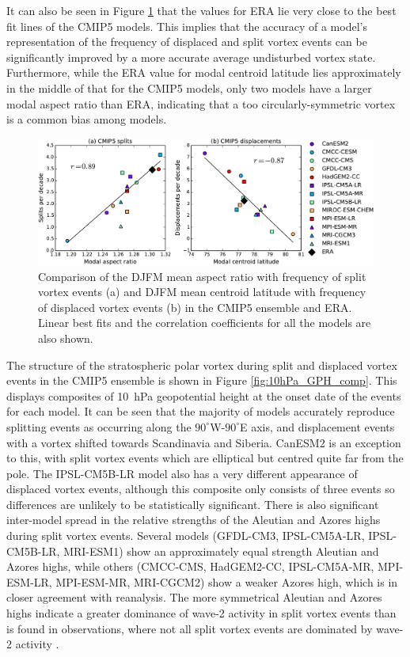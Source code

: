 It can also be seen in Figure \ref{fig:cmip5_moments_scatter} that the values
for ERA lie very close to the best fit lines of the CMIP5 models. This implies
that the accuracy of a model's representation of the frequency of displaced and
split vortex events can be significantly improved by a more accurate average
undisturbed vortex state. Furthermore, while the ERA value for modal centroid
latitude lies approximately in the middle of that for the CMIP5 models, only two
models have a larger modal aspect ratio than ERA, indicating that a too
circularly-symmetric vortex is a common bias among models.

\begin{figure}
 \centering
 \noindent\includegraphics[width=\textwidth]{figures/chapter-models/CMIP5_moments_scatter.pdf}
 \caption[Comparison of moment diagnostics and frequency of split and displaced
 vortex events.]{Comparison of the DJFM mean aspect ratio with frequency of
   split vortex events (a) and DJFM mean centroid latitude with frequency of
   displaced vortex events (b) in the CMIP5 ensemble and ERA. Linear best fits
   and the correlation coefficients for all the models are also shown.}
 \label{fig:cmip5_moments_scatter}
\end{figure}

The structure of the stratospheric polar vortex during split and displaced
vortex events in the CMIP5 ensemble is shown in Figure
\ref{fig:10hPa_GPH_comp}. This displays composites of 10~hPa geopotential
height at the onset date of the events for each model. It can be seen that the
majority of models accurately reproduce splitting events as occurring along the
$90^{\circ}$W-$90^{\circ}$E axis, and displacement events with a vortex shifted
towards Scandinavia and Siberia. CanESM2 is an exception to this, with split
vortex events which are elliptical but centred quite far from the pole. The
IPSL-CM5B-LR model also has a very different appearance of displaced vortex
events, although this composite only consists of three events so differences are
unlikely to be statistically significant. There is also significant inter-model
spread in the relative strengths of the Aleutian and Azores highs during split
vortex events. Several models (GFDL-CM3, IPSL-CM5A-LR, IPSL-CM5B-LR, MRI-ESM1)
show an approximately equal strength Aleutian and Azores highs, while others
(CMCC-CMS, HadGEM2-CC, IPSL-CM5A-MR, MPI-ESM-LR, MPI-ESM-MR, MRI-CGCM2) show a
weaker Azores high, which is in closer agreement with reanalysis. The more
symmetrical Aleutian and Azores highs indicate a greater dominance of wave-2
activity in split vortex events than is found in observations, where not all
split vortex events are dominated by wave-2 activity \citep{Mitchell2013}.

